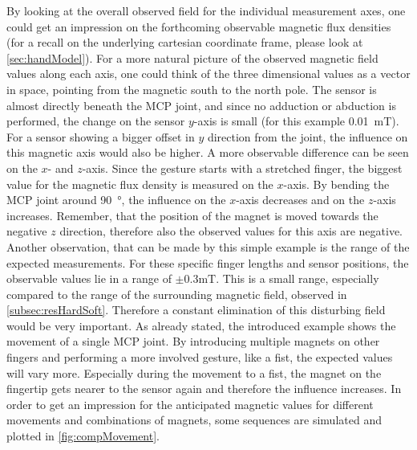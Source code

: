 By looking at the overall observed field for the individual measurement axes, one could get an impression on the forthcoming observable magnetic flux densities (for a recall on the underlying cartesian coordinate frame, please look at \ref{sec:handModel}). For a more natural picture of the observed magnetic field values along each axis, one could think of the three dimensional values as a vector in space, pointing from the magnetic south to the north pole. The sensor is almost directly beneath the \ac{MCP} joint, and since no adduction or abduction is performed, the change on the sensor $ y $-axis is small (for this example \SI{0.01}{\milli \tesla}). For a sensor showing a bigger offset in $ y $ direction from the joint, the influence on this magnetic axis would also be higher. A more observable difference can be seen on the $ x $- and $ z $-axis. Since the gesture starts with a stretched finger, the biggest value for the magnetic flux density is measured on the $ x $-axis. By bending the \ac{MCP} joint around \SI{90}{\degree}, the influence on the $ x $-axis decreases and on the $ z $-axis increases. Remember, that the position of the magnet is moved towards the negative $ z $ direction, therefore also the observed values for this axis are negative. Another observation, that can be made by this simple example is the range of the expected measurements. For these specific finger lengths and sensor positions, the observable values lie in a range of $ \pm 0.3\si{\milli \tesla} $. This is a small range, especially compared to the range of the surrounding magnetic field, observed in \ref{subsec:resHardSoft}. Therefore a constant elimination of this disturbing field would be very important. As already stated, the introduced example shows the movement of a single \ac{MCP} joint. By introducing multiple magnets on other fingers and performing a more involved gesture, like a fist, the expected values will vary more. Especially during the movement to a fist, the magnet on the fingertip gets nearer to the sensor again and therefore the influence increases. In order to get an impression for the anticipated magnetic values for different movements and combinations of magnets, some sequences are simulated and plotted in \ref{fig:compMovement}.\\
